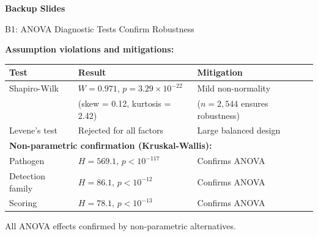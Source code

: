 \documentclass[aspectratio=169,11pt]{beamer}
\begin{document}
\appendix
{}
\setcounter{framenumberappendix}{\value{framenumber}}

\begin{frame}
\begin{center}
\vspace{2cm}
{\Huge\bfseries Backup Slides}
\vspace{1cm}
\end{center}
\end{frame}

\begin{frame}{B1: ANOVA Diagnostic Tests Confirm Robustness}

\textbf{Assumption violations and mitigations:}

\vspace{0.5em}
\begin{tabular}{lll}
\toprule
\textbf{Test} & \textbf{Result} & \textbf{Mitigation} \\
\midrule
Shapiro-Wilk & $W = 0.971$, $p = 3.29 \times 10^{-22}$ & Mild non-normality \\
 & (skew = 0.12, kurtosis = 2.42) & ($n = 2{,}544$ ensures robustness) \\
Levene's test & Rejected for all factors & Large balanced design \\
\midrule
\multicolumn{3}{l}{\textbf{Non-parametric confirmation (Kruskal-Wallis):}} \\
\midrule
Pathogen & $H = 569.1$, $p < 10^{-117}$ & Confirms ANOVA \\
Detection family & $H = 86.1$, $p < 10^{-12}$ & Confirms ANOVA \\
Scoring & $H = 78.1$, $p < 10^{-13}$ & Confirms ANOVA \\
\bottomrule
\end{tabular}

\vspace{0.5em}
All ANOVA effects confirmed by non-parametric alternatives.
\end{frame}
\end{document}
